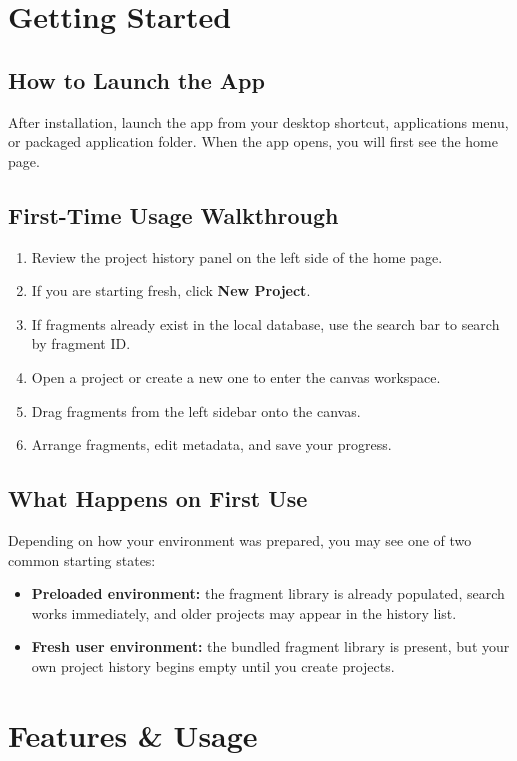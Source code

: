 \documentclass[12pt]{article}
\begin{document}
\section{Getting Started}

\subsection{How to Launch the App}
After installation, launch the app from your desktop shortcut, applications menu,
or packaged application folder. When the app opens, you will first see the home page.

\subsection{First-Time Usage Walkthrough}
\begin{enumerate}
  \item Review the project history panel on the left side of the home page.
  \item If you are starting fresh, click \textbf{New Project}.
  \item If fragments already exist in the local database, use the search bar to search by fragment ID.
  \item Open a project or create a new one to enter the canvas workspace.
  \item Drag fragments from the left sidebar onto the canvas.
  \item Arrange fragments, edit metadata, and save your progress.
\end{enumerate}

\subsection{What Happens on First Use}
Depending on how your environment was prepared, you may see one of two common starting states:
\begin{itemize}
  \item \textbf{Preloaded environment:} the fragment library is already populated, search works immediately, and older projects may appear in the history list.
  \item \textbf{Fresh user environment:} the bundled fragment library is present, but your own project history begins empty until you create projects.
\end{itemize}

\section{Features \& Usage}
\end{document}
